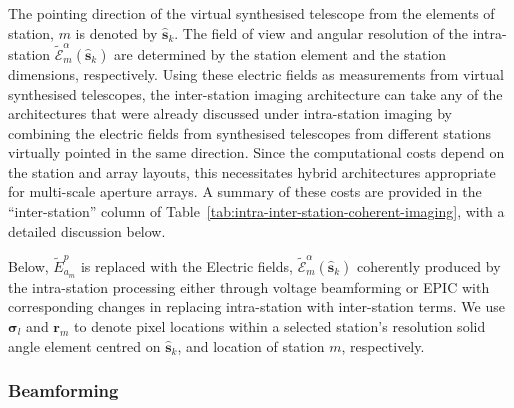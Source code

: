 \documentclass[
  journal=pasa,
  manuscript=article-type,
  year=2020,
  volume=37,
]{cup-journal}
\begin{document}
The pointing direction of the virtual synthesised telescope from the elements of station, $m$ is denoted by $\hat{\boldsymbol{s}}_k$. The field of view and angular resolution of the intra-station $\widetilde{\mathcal{E}}_m^\alpha(\hat{\boldsymbol{s}}_k)$ are determined by the station element and the station dimensions, respectively. Using these electric fields as measurements from virtual synthesised telescopes, the inter-station imaging architecture can take any of the architectures that were already discussed under intra-station imaging by combining the electric fields from synthesised telescopes from different stations virtually pointed in the same direction. Since the computational costs depend on the station and array layouts, this necessitates hybrid architectures appropriate for multi-scale aperture arrays. A summary of these costs are provided in the ``inter-station'' column of Table~\ref{tab:intra-inter-station-coherent-imaging}, with a detailed discussion below. 

Below, $\widetilde{E}_{a_m}^p$ is replaced with the Electric fields, $\widetilde{\mathcal{E}}_m^\alpha(\hat{\boldsymbol{s}}_k)$
coherently produced by the intra-station processing either through voltage beamforming or EPIC with corresponding changes in replacing intra-station with inter-station terms. We use $\boldsymbol{\sigma}_l$ and $\boldsymbol{r}_{m}$ to denote pixel locations within a selected station's resolution solid angle element centred on $\hat{\boldsymbol{s}}_k$, and location of station $m$, respectively. 

\subsubsection{Beamforming}
\end{document}
